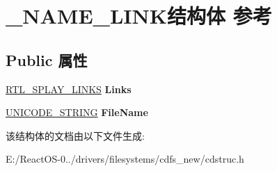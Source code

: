 \hypertarget{struct___n_a_m_e___l_i_n_k}{}\section{\+\_\+\+N\+A\+M\+E\+\_\+\+L\+I\+N\+K结构体 参考}
\label{struct___n_a_m_e___l_i_n_k}
\subsection*{Public 属性}
\begin{DoxyCompactItemize}
\item 
\mbox{\label{struct___n_a_m_e___l_i_n_k_ad9f9bc421ab32e73fbba354c4cd2bc2c}} 
\hyperlink{struct___r_t_l___s_p_l_a_y___l_i_n_k_s}{R\+T\+L\+\_\+\+S\+P\+L\+A\+Y\+\_\+\+L\+I\+N\+KS} {\bfseries Links}
\item 
\mbox{\label{struct___n_a_m_e___l_i_n_k_ae5d3f58ec53fca33addd201606cbf0f3}} 
\hyperlink{struct___u_n_i_c_o_d_e___s_t_r_i_n_g}{U\+N\+I\+C\+O\+D\+E\+\_\+\+S\+T\+R\+I\+NG} {\bfseries File\+Name}
\end{DoxyCompactItemize}


该结构体的文档由以下文件生成\+:\begin{DoxyCompactItemize}
\item 
E\+:/\+React\+O\+S-\/0../drivers/filesystems/cdfs\+\_\+new/cdstruc.\+h\end{DoxyCompactItemize}
